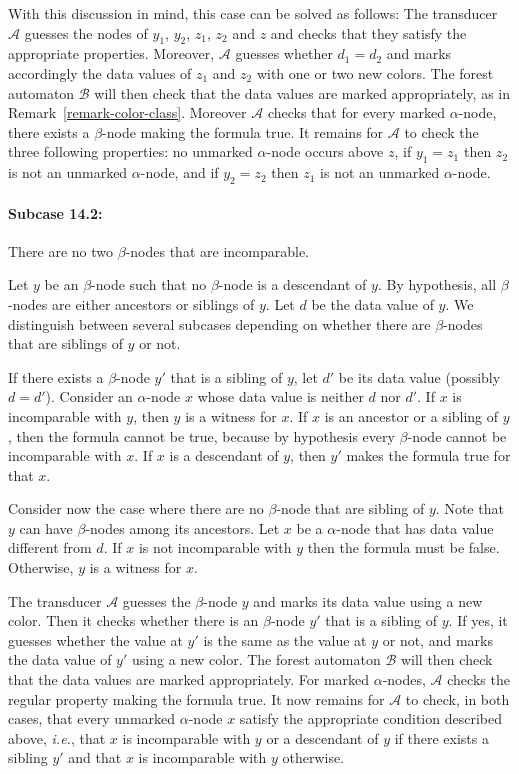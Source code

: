 \documentclass{CSML}
\newcommand\Aa{\mathcal{A}}
\newcommand\Ba{\mathcal{B}}
\begin{document}
With this discussion in mind, this case can be solved as follows:
The transducer $\Aa$ guesses the nodes of $y_1$, $y_2$, $z_1$, $z_2$ and $z$ 
and checks that they satisfy the appropriate properties. 
Moreover, $\Aa$ guesses whether $d_1=d_2$ and marks accordingly the data values 
of $z_1$ and $z_2$ with one or two new colors. 
The forest automaton $\Ba$ will then check that the data values are marked appropriately, 
as in Remark~\ref{remark-color-class}.
Moreover $\Aa$ checks that for every marked $\alpha$-node, 
there exists a $\beta$-node making the formula true. 
It remains for $\Aa$ to check the three following properties: 
no unmarked $\alpha$-node occurs above $z$,
if $y_1=z_1$ then $z_2$ is not an unmarked $\alpha$-node,
and if $y_2=z_2$ then $z_1$ is not an unmarked $\alpha$-node.

\paragraph{\bf Subcase 14.2:} There are no two $\beta$-nodes that are incomparable. 

Let $y$ be an $\beta$-node such that no $\beta$-node is
a descendant of $y$. By hypothesis, all $\beta$-nodes are either ancestors
or siblings of $y$. Let $d$ be the data value of $y$.
We distinguish between several subcases depending on whether there are $\beta$-nodes
that are siblings of $y$ or not.

If there exists a $\beta$-node $y'$ that is a sibling of $y$, 
let $d'$ be its data value (possibly $d = d'$).
Consider an $\alpha$-node $x$ whose data value is neither $d$ nor $d'$.
If $x$ is incomparable with $y$, then $y$ is a witness for $x$. 
If $x$ is an ancestor or a sibling of $y$, 
then the formula cannot be true, because by hypothesis
every $\beta$-node cannot be incomparable with $x$.
If $x$ is a descendant of $y$, then $y'$ makes the formula true for that $x$.

Consider now the case where there are no $\beta$-node that are sibling of $y$.
Note that $y$ can have $\beta$-nodes among its ancestors.
Let $x$ be a $\alpha$-node that has data value different from $d$. 
If $x$ is not incomparable with $y$ then the formula must be false. 
Otherwise, $y$ is a witness for $x$.

The transducer $\Aa$ guesses the $\beta$-node $y$ and marks its data value using a new color. 
Then it checks whether there is an $\beta$-node $y'$ that is a sibling of $y$.
If yes, it guesses whether the value at $y'$ is the same as the value at $y$ or not,
and marks the data value of $y'$ using a new color.
The forest automaton $\Ba$ will then check that the data values are marked appropriately.
For marked $\alpha$-nodes, $\Aa$ checks the regular property making the formula true.
It now remains for $\Aa$ to check, in both cases, 
that every unmarked $\alpha$-node $x$
satisfy the appropriate condition described above,
\textit{i.e.},
 that $x$ is incomparable with $y$ or a descendant of $y$ 
 if there exists a sibling $y'$ 
 and that $x$ is incomparable with $y$ otherwise.
\end{document}
